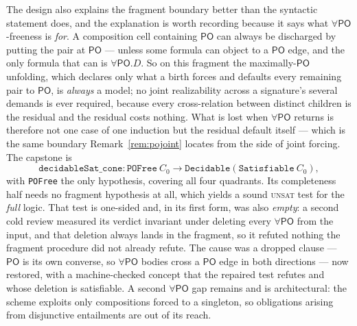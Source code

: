 \documentclass[11pt]{article}
\newcommand{\PO}{\mathsf{PO}}
\newcommand{\code}[1]{\texttt{#1}}
\theoremstyle{plain}
\theoremstyle{definition}
\begin{document}
The design also explains the fragment boundary better than the syntactic
statement does, and the explanation is worth recording because it says what
$\forall\PO$-freeness is \emph{for}. A composition cell containing $\PO$ can
always be discharged by putting the pair at $\PO$ --- unless some formula can
object to a $\PO$ edge, and the only formula that can is $\forall\PO.D$. So on
this fragment the maximally-$\PO$ unfolding, which declares only what a birth
forces and defaults every remaining pair to $\PO$, is \emph{always} a model;
no joint realizability across a signature's several demands is ever required,
because every cross-relation between distinct children is the residual and the
residual costs nothing. What is lost when $\forall\PO$ returns is therefore not
one case of one induction but the residual default itself --- which is the same
boundary Remark~\ref{rem:pojoint} locates from the side of joint forcing. The capstone is
\[
  \code{decidableSat\_cone} : \code{POFree}\ C_0 \to \code{Decidable}
  (\code{Satisfiable}\ C_0),
\]
with \code{POFree} the only hypothesis, covering all four quadrants. Its
completeness half needs no fragment hypothesis at all, which yields a sound
\textsc{unsat} test for the \emph{full} logic. That test is one-sided and, in
its first form, was also \emph{empty}: a second cold review measured its verdict
invariant under deleting every $\forall\PO$ from the input, and that deletion
always lands in the fragment, so it refuted nothing the fragment procedure did
not already refute. The cause was a dropped clause --- $\PO$ is its own converse,
so $\forall\PO$ bodies cross a $\PO$ edge in both directions --- now restored,
with a machine-checked concept that the repaired test refutes and whose deletion
is satisfiable. A second $\forall\PO$ gap remains and is architectural: the
scheme exploits only compositions forced to a singleton, so obligations arising
from disjunctive entailments are out of its reach.
\end{document}

